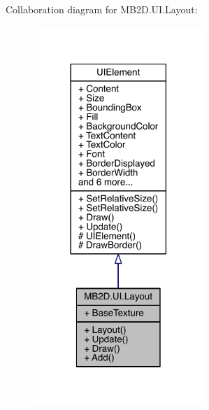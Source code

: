 Collaboration diagram for M\+B2\+D.\+U\+I.\+Layout\+:
\nopagebreak
\begin{figure}[H]
\begin{center}
\leavevmode
\includegraphics[width=182pt]{class_m_b2_d_1_1_u_i_1_1_layout__coll__graph}
\end{center}
\end{figure}
